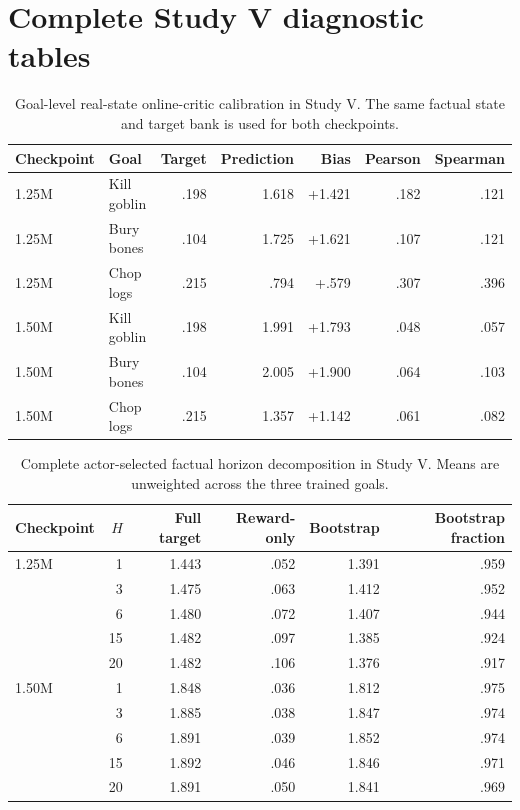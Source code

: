 \documentclass[10pt]{article}
\begin{document}
\section{Complete Study V diagnostic tables}

\begin{table}[H]
\centering
\scriptsize
\caption{Goal-level real-state online-critic calibration in Study V. The same factual state and target bank is used for both checkpoints.}
\begin{tabular}{llrrrrr}
\toprule
Checkpoint & Goal & Target & Prediction & Bias & Pearson & Spearman \\
\midrule
1.25M & Kill goblin & .198 & 1.618 & +1.421 & .182 & .121 \\
1.25M & Bury bones  & .104 & 1.725 & +1.621 & .107 & .121 \\
1.25M & Chop logs   & .215 & .794  & +.579  & .307 & .396 \\
\midrule
1.50M & Kill goblin & .198 & 1.991 & +1.793 & .048 & .057 \\
1.50M & Bury bones  & .104 & 2.005 & +1.900 & .064 & .103 \\
1.50M & Chop logs   & .215 & 1.357 & +1.142 & .061 & .082 \\
\bottomrule
\end{tabular}
\end{table}

\begin{table}[H]
\centering
\scriptsize
\caption{Complete actor-selected factual horizon decomposition in Study V. Means are unweighted across the three trained goals.}
\begin{tabular}{lrrrrr}
\toprule
Checkpoint & $H$ & Full target & Reward-only & Bootstrap & Bootstrap fraction \\
\midrule
1.25M & 1  & 1.443 & .052 & 1.391 & .959 \\
      & 3  & 1.475 & .063 & 1.412 & .952 \\
      & 6  & 1.480 & .072 & 1.407 & .944 \\
      & 15 & 1.482 & .097 & 1.385 & .924 \\
      & 20 & 1.482 & .106 & 1.376 & .917 \\
\midrule
1.50M & 1  & 1.848 & .036 & 1.812 & .975 \\
      & 3  & 1.885 & .038 & 1.847 & .974 \\
      & 6  & 1.891 & .039 & 1.852 & .974 \\
      & 15 & 1.892 & .046 & 1.846 & .971 \\
      & 20 & 1.891 & .050 & 1.841 & .969 \\
\bottomrule
\end{tabular}
\end{table}
\end{document}
